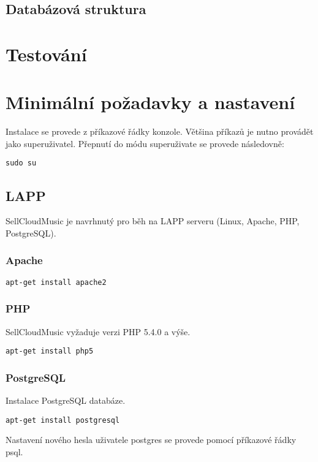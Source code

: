 \documentclass[12pt]{article}
\begin{document}
\subsection{Databázová struktura}

\section{Testování}


\newpage

\section{Minimální požadavky a nastavení}

Instalace se provede z příkazové řádky konzole. Většina příkazů je nutno provádět jako superuživatel. Přepnutí do módu superuživate se provede následovně:\newline

\texttt{sudo su}

\subsection{LAPP}

SellCloudMusic je navrhnutý pro běh na LAPP serveru (Linux, Apache, PHP, PostgreSQL).

\subsubsection{Apache}
\texttt{apt-get install apache2}

\subsubsection{PHP}

SellCloudMusic vyžaduje verzi PHP 5.4.0 a výše.\newline

\texttt{apt-get install php5}\newline

\subsubsection{PostgreSQL} \label{pgsql}

Instalace PostgreSQL databáze.

\texttt{apt-get install postgresql}

Nastavení nového hesla uživatele postgres se provede pomocí příkazové řádky psql.\newline
\end{document}
